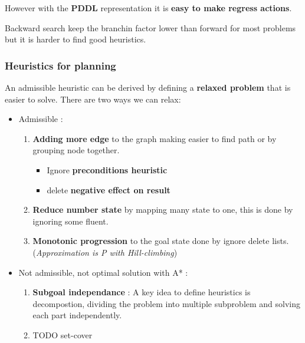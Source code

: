 However with the \textbf{PDDL} representation it is \textbf{easy to make regress actions}.

Backward search  keep the  branchin factor lower  than forward  for most
problems but it is harder to find good heuristics.


\subsubsection{Heuristics for planning}

An admissible heuristic can be derived by defining a \textbf{relaxed problem} that
is easier to solve. There are two ways we can relax:
\begin{itemize}
    \item Admissible :

    \begin{enumerate}
        \item \textbf{Adding more edge} to the graph
            making easier to find path or by grouping node together.
            \begin{itemize}
                \item Ignore \textbf{preconditions heuristic} 
                \item delete \textbf{negative effect on result}
            \end{itemize} 

        \item \textbf{Reduce  number state}  by mapping  many state  to one,
           this is done by ignoring some fluent.

       \item \textbf{Monotonic progression} to the goal state done by ignore delete
           lists. (\textit{Approximation is P with Hill-climbing})
    \end{enumerate}

    \item Not admissible, not optimal solution with A* :

        \begin{enumerate}
            \item \textbf{Subgoal independance} :
                A key  idea to define  heuristics is decompostion, dividing  the problem
                into multiple subproblem and solving each part independently.

            \item TODO set-cover

        \end{enumerate}
\end{itemize}


